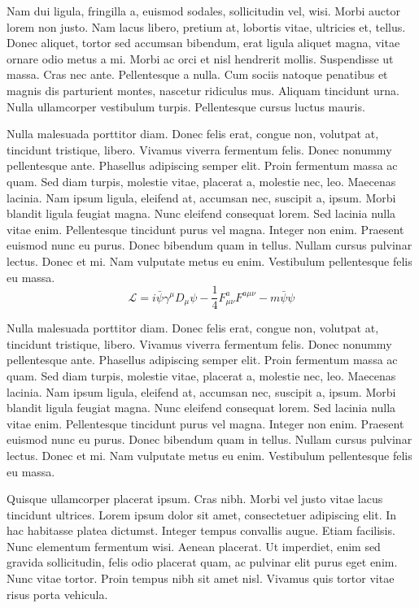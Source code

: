 \documentclass[ASNA,twocolumn]{USG} %
\begin{document}
{Nam dui ligula, fringilla a, euismod sodales, sollicitudin vel, wisi. Morbi auctor lorem non justo. Nam lacus libero,
pretium at, lobortis vitae, ultricies et, tellus. Donec aliquet, tortor sed accumsan bibendum, erat ligula aliquet magna,
vitae ornare odio metus a mi. Morbi ac orci et nisl hendrerit mollis. Suspendisse ut massa. Cras nec ante. Pellentesque
a nulla. Cum sociis natoque penatibus et magnis dis parturient montes, nascetur ridiculus mus. Aliquam tincidunt
urna. Nulla ullamcorper vestibulum turpis. Pellentesque cursus luctus mauris.

Nulla malesuada porttitor diam. Donec felis erat, congue non, volutpat at, tincidunt tristique, libero. Vivamus
viverra fermentum felis. Donec nonummy pellentesque ante. Phasellus adipiscing semper elit. Proin fermentum massa
ac quam. Sed diam turpis, molestie vitae, placerat a, molestie nec, leo. Maecenas lacinia. Nam ipsum ligula, eleifend
at, accumsan nec, suscipit a, ipsum. Morbi blandit ligula feugiat magna. Nunc eleifend consequat lorem. Sed lacinia
nulla vitae enim. Pellentesque tincidunt purus vel magna. Integer non enim. Praesent euismod nunc eu purus. Donec
bibendum quam in tellus. Nullam cursus pulvinar lectus. Donec et mi. Nam vulputate metus eu enim. Vestibulum
pellentesque felis eu massa.
\begin{equation}
\mathcal{L} = i \bar{\psi} \gamma^\mu D_\mu \psi
    - \frac{1}{4} F_{\mu\nu}^a F^{a\mu\nu} - m \bar{\psi} \psi
\label{eq26}
\end{equation}

Nulla malesuada porttitor diam. Donec felis erat, congue non, volutpat at, tincidunt tristique, libero. Vivamus
viverra fermentum felis. Donec nonummy pellentesque ante. Phasellus adipiscing semper elit. Proin fermentum massa
ac quam. Sed diam turpis, molestie vitae, placerat a, molestie nec, leo. Maecenas lacinia. Nam ipsum ligula, eleifend
at, accumsan nec, suscipit a, ipsum. Morbi blandit ligula feugiat magna. Nunc eleifend consequat lorem. Sed lacinia
nulla vitae enim. Pellentesque tincidunt purus vel magna. Integer non enim. Praesent euismod nunc eu purus. Donec
bibendum quam in tellus. Nullam cursus pulvinar lectus. Donec et mi. Nam vulputate metus eu enim. Vestibulum
pellentesque felis eu massa.

Quisque ullamcorper placerat ipsum. Cras nibh. Morbi vel justo vitae lacus tincidunt ultrices. Lorem ipsum dolor sit
amet, consectetuer adipiscing elit. In hac habitasse platea dictumst. Integer tempus convallis augue. Etiam facilisis.
Nunc elementum fermentum wisi. Aenean placerat. Ut imperdiet, enim sed gravida sollicitudin, felis odio placerat
quam, ac pulvinar elit purus eget enim. Nunc vitae tortor. Proin tempus nibh sit amet nisl. Vivamus quis tortor
vitae risus porta vehicula.


}
\end{document}
